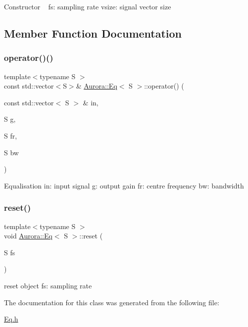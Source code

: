 Constructor ~\newline
fs\+: sampling rate vsize\+: signal vector size 

\subsection{Member Function Documentation}
\mbox{\label{class_aurora_1_1_eq_ac2f97d6c90c4224c9711c00d153c0165}} 
\subsubsection{\texorpdfstring{operator()()}{operator()()}}
{\footnotesize\ttfamily template$<$typename S $>$ \\
const std\+::vector$<$S$>$\& \hyperlink{class_aurora_1_1_eq}{Aurora\+::\+Eq}$<$ S $>$\+::operator() (\begin{DoxyParamCaption}\item[{const std\+::vector$<$ S $>$ \&}]{in,  }\item[{S}]{g,  }\item[{S}]{fr,  }\item[{S}]{bw }\end{DoxyParamCaption})\hspace{0.3cm}{\ttfamily [inline]}}

Equalisation in\+: input signal g\+: output gain fr\+: centre frequency bw\+: bandwidth \mbox{\label{class_aurora_1_1_eq_a18e65881b8776c78092c672b9f0ffba3}} 
\subsubsection{\texorpdfstring{reset()}{reset()}}
{\footnotesize\ttfamily template$<$typename S $>$ \\
void \hyperlink{class_aurora_1_1_eq}{Aurora\+::\+Eq}$<$ S $>$\+::reset (\begin{DoxyParamCaption}\item[{S}]{fs }\end{DoxyParamCaption})\hspace{0.3cm}{\ttfamily [inline]}}

reset object fs\+: sampling rate 

The documentation for this class was generated from the following file\+:\begin{DoxyCompactItemize}
\item 
\hyperlink{_eq_8h}{Eq.\+h}\end{DoxyCompactItemize}
